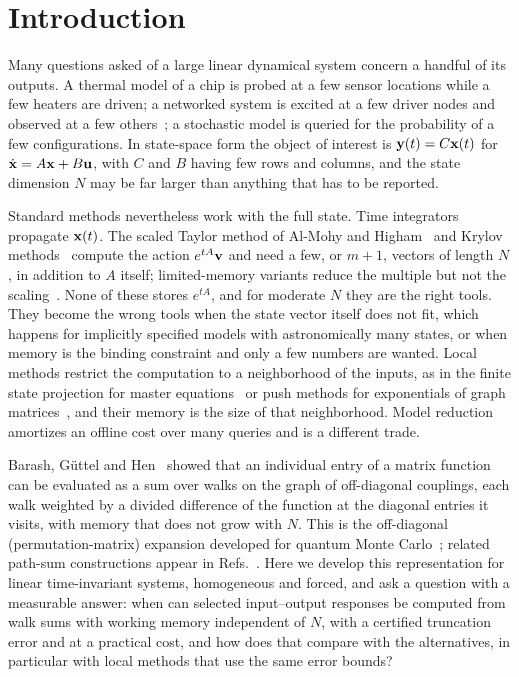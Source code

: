 \documentclass[aps,pra,superscriptaddress,floatfix,longbibliography,twocolumn]{revtex4-2}
\newcommand{\bx}{{\bf x}}
\newcommand{\bu}{{\bf u}}
\newcommand{\by}{{\bf y}}
\newcommand{\bv}{{\bf v}}
\begin{document}
\section{Introduction}\label{sec:intro}

Many questions asked of a large linear dynamical system concern a handful of its outputs. A thermal model of a chip is probed at a few sensor locations while a few heaters are driven; a networked system is excited at a few driver nodes and observed at a few others~\cite{liu2011,pasqualetti2014,mesbahi2010}; a stochastic model is queried for the probability of a few configurations. In state-space form the object of interest is $\by(t)=C\bx(t)$ for $\dot\bx=A\bx+B\bu$, with $C$ and $B$ having few rows and columns, and the state dimension $N$ may be far larger than anything that has to be reported.

Standard methods nevertheless work with the full state. Time integrators propagate $\bx(t)$. The scaled Taylor method of Al-Mohy and Higham~\cite{almohy2011} and Krylov methods~\cite{hochbruck1997,sidje1998} compute the action $e^{tA}\bv$ and need a few, or $m+1$, vectors of length $N$, in addition to $A$ itself; limited-memory variants reduce the multiple but not the scaling~\cite{guttel2020}. None of these stores $e^{tA}$, and for moderate $N$ they are the right tools. They become the wrong tools when the state vector itself does not fit, which happens for implicitly specified models with astronomically many states, or when memory is the binding constraint and only a few numbers are wanted. Local methods restrict the computation to a neighborhood of the inputs, as in the finite state projection for master equations~\cite{munsky2006} or push methods for exponentials of graph matrices~\cite{kloster2014,gleich2015}, and their memory is the size of that neighborhood. Model reduction~\cite{antoulas2005} amortizes an offline cost over many queries and is a different trade.

Barash, G\"uttel and Hen~\cite{barash2022} showed that an individual entry of a matrix function can be evaluated as a sum over walks on the graph of off-diagonal couplings, each walk weighted by a divided difference of the function at the diagonal entries it visits, with memory that does not grow with $N$. This is the off-diagonal (permutation-matrix) expansion developed for quantum Monte Carlo~\cite{albash2017,gupta2020pmr}; related path-sum constructions appear in Refs.~\cite{giscard2013,giscard2015,gorban2011}. Here we develop this representation for linear time-invariant systems, homogeneous and forced, and ask a question with a measurable answer: when can selected input--output responses be computed from walk sums with working memory independent of $N$, with a certified truncation error and at a practical cost, and how does that compare with the alternatives, in particular with local methods that use the same error bounds?
\end{document}
